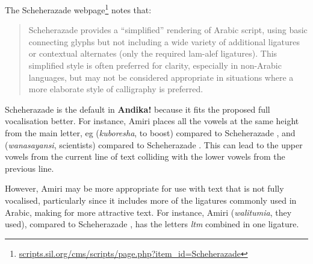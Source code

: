 The Scheherazade webpage\footnote{\url{scripts.sil.org/cms/scripts/page.php?item_id=Scheherazade}} notes that:
\begin{quotation}
Scheherazade provides a “simplified” rendering of Arabic script, using basic connecting glyphs but not including a wide variety of additional ligatures or contextual alternates (only the required lam-alef ligatures). This simplified style is often preferred for clarity, especially in non-Arabic languages, but may not be considered appropriate in situations where a more elaborate style of calligraphy is preferred.
\end{quotation}

Scheherazade is the default in \textbf{Andika!} because it fits the proposed full vocalisation better.  For instance, Amiri places all the vowels at the same height from the main letter, eg  (\textit{kuboresha}, to boost) compared to Scheherazade , and  (\textit{wanasayansi}, scientists) compared to Scheherazade . This can lead to the upper vowels from the current line of text colliding with the lower vowels from the previous line.

However, Amiri may be more appropriate for use with text that is not fully vocalised, particularly since it includes more of the ligatures commonly used in Arabic, making for more attractive text. For instance, Amiri  (\textit{walitumia}, they used), compared to Scheherazade , has the letters \textit{ltm} combined in one ligature.
